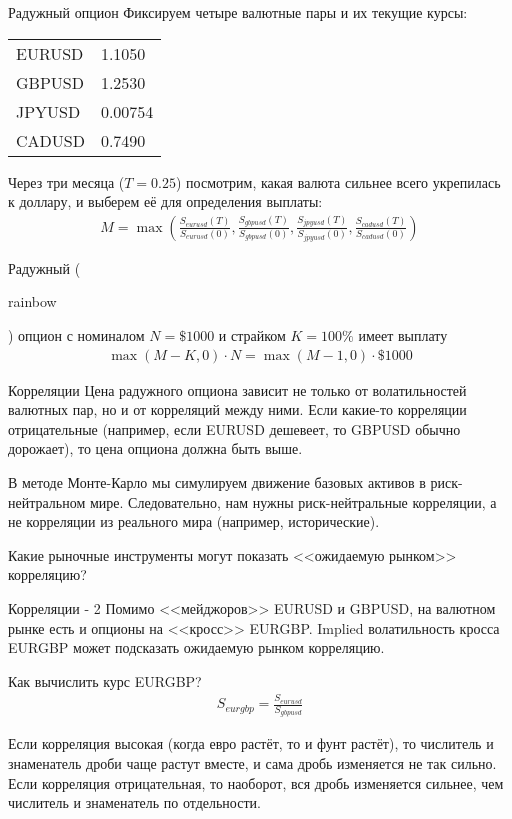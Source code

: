 \documentclass{beamer}
\newcommand{\en}[1]{\begin{otherlanguage}{english}#1\end{otherlanguage}}
\begin{document}
\begin{frame}{Радужный опцион}
\justify
Фиксируем четыре валютные пары и их текущие курсы:

\centering
\begin{tabular}{l|l}
EURUSD & 1.1050 \\
GBPUSD & 1.2530 \\
JPYUSD & 0.00754 \\
CADUSD & 0.7490
\end{tabular}

\justify
Через три месяца ($T=0.25$) посмотрим, какая валюта сильнее всего укрепилась к доллару, и выберем её для определения выплаты:
\begin{align*}
M = \max\left(\frac{S_{eurusd}(T)}{S_{eurusd}(0)}, \frac{S_{gbpusd}(T)}{S_{gbpusd}(0)}, \frac{S_{jpyusd}(T)}{S_{jpyusd}(0)}, \frac{S_{cadusd}(T)}{S_{cadusd}(0)} \right)
\end{align*}

\justify 
Радужный (\en{rainbow}) опцион с номиналом $N=\$1000$ и страйком $K=100\%$ имеет выплату
\begin{align*}
\max(M - K, 0) \cdot N = \max(M-1, 0) \cdot \$1000
\end{align*}
\end{frame}



\begin{frame}{Корреляции}
\justify
Цена радужного опциона зависит не только от волатильностей валютных пар, но и от корреляций между ними. Если какие-то корреляции отрицательные (например, если EURUSD дешевеет, то GBPUSD обычно дорожает), то цена опциона должна быть выше.

\justify
В методе Монте-Карло мы симулируем движение базовых активов в риск-нейтральном мире. Следовательно, нам нужны риск-нейтральные корреляции, а не корреляции из реального мира (например, исторические).

\justify
Какие рыночные инструменты могут показать <<ожидаемую рынком>> корреляцию?
\end{frame}



\begin{frame}{Корреляции - 2}
\justify
Помимо <<мейджоров>> EURUSD и GBPUSD, на валютном рынке есть и опционы на <<кросс>> EURGBP. Implied волатильность кросса EURGBP может подсказать ожидаемую рынком корреляцию.

\justify
Как вычислить курс EURGBP?
\begin{align*}
S_{eurgbp} = \frac{S_{eurusd}}{S_{gbpusd}}
\end{align*}

\justify
Если корреляция высокая (когда евро растёт, то и фунт растёт), то числитель и знаменатель дроби чаще растут вместе, и сама дробь изменяется не так сильно. Если корреляция отрицательная, то наоборот, вся дробь изменяется сильнее, чем числитель и знаменатель по отдельности.
\end{frame}
\end{document}
